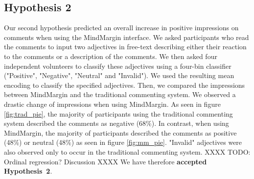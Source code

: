\subsection{Hypothesis 2}
Our second hypothesis predicted an overall increase in positive impressions on comments when using the MindMargin interface. We asked participants who read the comments to input two adjectives in free-text describing either their reaction to the comments or a description of the comments. We then asked four independent volunteers to classify these adjectives using a four-bin classifier ("Positive", "Negative", "Neutral" and "Invalid"). We used the resulting mean encoding to classify the specified adjectives. Then, we compared the impressions between MindMargin and the traditional commenting system. We observed a drastic change of impressions when using MindMargin. As seen in figure \ref{fig:trad_pie}, the majority of participants using the traditional commenting system described the comments as negative (68\%). In contrast, when using MindMargin, the majority of participants described the comments as positive (48\%) or neutral (48\%) as seen in figure \ref{fig:mm_pie}. "Invalid" adjectives were also observed only to occur in the traditional commenting system. XXXX TODO: Ordinal regression? Discussion XXXX We have therefore \textbf{accepted Hypothesis~2}. 


